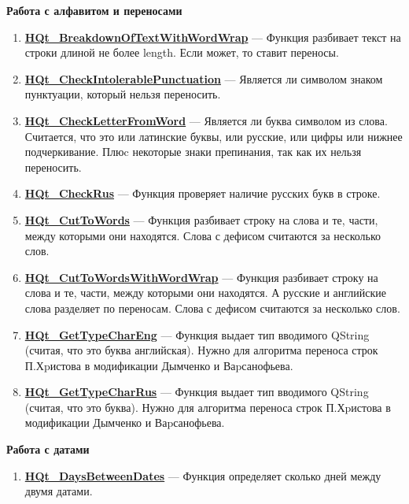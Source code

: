 \documentclass[a4paper,12pt]{article}
\begin{document}
\textbf{Работа с алфавитом и переносами}
\begin{enumerate}

\item \textbf{\hyperref[HQt_BreakdownOfTextWithWordWrap]{HQt\_BreakdownOfTextWithWordWrap}} --- Функция разбивает текст на строки длиной не более length. Если может, то ставит переносы.

\item \textbf{\hyperref[HQt_CheckIntolerablePunctuation]{HQt\_CheckIntolerablePunctuation}} --- Является ли символом знаком пунктуации, который нельзя переносить.

\item \textbf{\hyperref[HQt_CheckLetterFromWord]{HQt\_CheckLetterFromWord}} --- Является ли буква символом из слова. Считается, что это или латинские буквы, или русские, или цифры или нижнее подчеркивание. Плюc некоторые знаки препинания, так как их нельзя переносить.

\item \textbf{\hyperref[HQt_CheckRus]{HQt\_CheckRus}} --- Функция проверяет наличие русских букв в строке.

\item \textbf{\hyperref[HQt_CutToWords]{HQt\_CutToWords}} --- Функция разбивает строку на слова и те, части, между которыми они находятся. Слова с дефисом считаются за несколько слов.

\item \textbf{\hyperref[HQt_CutToWordsWithWordWrap]{HQt\_CutToWordsWithWordWrap}} --- Функция разбивает строку на слова и те, части, между которыми они находятся. А русские и английские слова разделяет по переносам. Слова с дефисом считаются за несколько слов.

\item \textbf{\hyperref[HQt_GetTypeCharEng]{HQt\_GetTypeCharEng}} --- Функция выдает тип вводимого QString (считая, что это буква английская). Нужно для алгоритма переноса строк П.Хpистова в модификации Дымченко и Ваpсанофьева.

\item \textbf{\hyperref[HQt_GetTypeCharRus]{HQt\_GetTypeCharRus}} --- Функция выдает тип вводимого QString (считая, что это буква). Нужно для алгоритма переноса строк П.Хpистова в модификации Дымченко и Ваpсанофьева.

\end{enumerate}

\textbf{Работа с датами}
\begin{enumerate}

\item \textbf{\hyperref[HQt_DaysBetweenDates]{HQt\_DaysBetweenDates}} --- Функция определяет сколько дней между двумя датами.

\end{enumerate}
\end{document}

